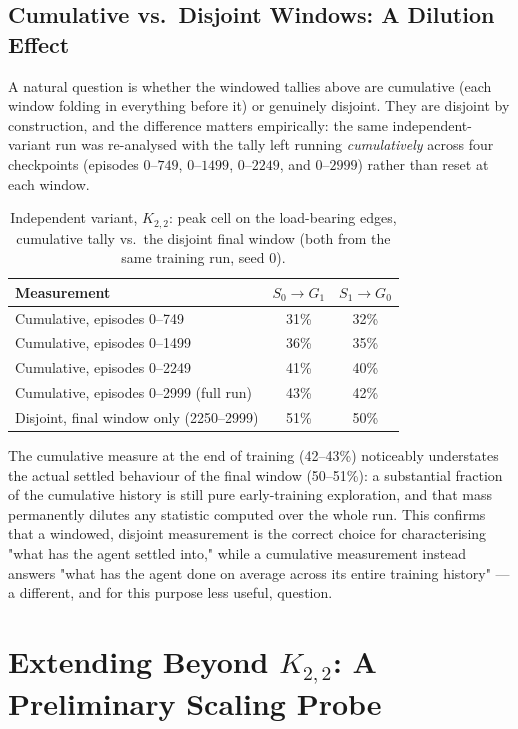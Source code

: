 \documentclass[a4paper,twoside,12pt]{report}
\begin{document}
\subsection{Cumulative vs.\ Disjoint Windows: A Dilution Effect}
\label{sec:results-arm-cumulative}

A natural question is whether the windowed tallies above are cumulative
(each window folding in everything before it) or genuinely disjoint. They are
disjoint by construction, and the difference matters empirically: the same
independent-variant run was re-analysed with the tally left running
\emph{cumulatively} across four checkpoints (episodes $0$--$749$,
$0$--$1499$, $0$--$2249$, and $0$--$2999$) rather than reset at each window.

\begin{table}[H]
\centering
\caption{Independent variant, $K_{2,2}$: peak cell on the load-bearing edges,
cumulative tally vs.\ the disjoint final window (both from the same training
run, seed 0).}
\label{tab:q1-arm-cumulative}
\begin{tabular}{lcc}
\toprule
\textbf{Measurement} & $S_0\!\to\!G_1$ & $S_1\!\to\!G_0$ \\
\midrule
Cumulative, episodes 0--749   & 31\% & 32\% \\
Cumulative, episodes 0--1499  & 36\% & 35\% \\
Cumulative, episodes 0--2249  & 41\% & 40\% \\
Cumulative, episodes 0--2999 (full run) & 43\% & 42\% \\
\midrule
Disjoint, final window only (2250--2999) & 51\% & 50\% \\
\bottomrule
\end{tabular}
\end{table}

The cumulative measure at the end of training (42--43\%) noticeably
understates the actual settled behaviour of the final window (50--51\%): a
substantial fraction of the cumulative history is still pure early-training
exploration, and that mass permanently dilutes any statistic computed over
the whole run. This confirms that a windowed, disjoint measurement is the
correct choice for characterising "what has the agent settled into," while a
cumulative measurement instead answers "what has the agent done on average
across its entire training history" --- a different, and for this purpose
less useful, question.

\section{Extending Beyond \texorpdfstring{$K_{2,2}$}{K2,2}: A Preliminary Scaling Probe}
\label{sec:results-scaling}
\end{document}
